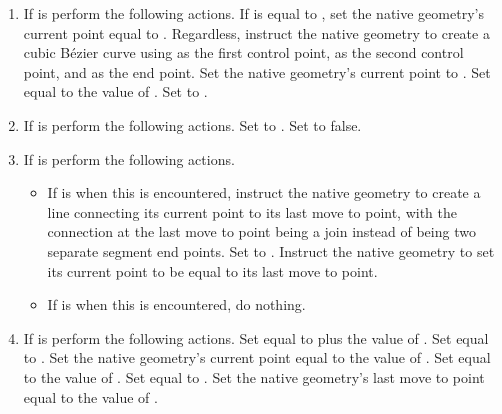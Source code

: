 \begin{enumerate}
\begin{enumerate}
	\item
	If  is  perform the following actions. If  is equal to , set the native geometry's current point equal to . Regardless, instruct the native geometry to create a cubic B\'{e}zier curve using  as the first control point,  as the second control point, and  as the end point. Set the native geometry's current point to . Set  equal to the value of . Set  to .
	
	\item
	If  is  perform the following actions. Set  to . Set  to false.
	
	\item
	If  is  perform the following actions.
	\begin{itemize}
		\item
		If  is  when this  is encountered, instruct the native geometry to create a line connecting its current point to its last move to point, with the connection at the last move to point being a join instead of being two separate segment end points. Set  to . Instruct the native geometry to set its current point to be equal to its last move to point. 
	
		\item
		If  is  when this  is encountered, do nothing.
	\end{itemize}
	
	\item
	If  is  perform the following actions. Set  equal to  plus the value of . Set  equal to . Set the native geometry's current point equal to the value of . Set  equal to the value of . Set  equal to . Set the native geometry's last move to point equal to the value of .


\end{enumerate}
\end{enumerate}
